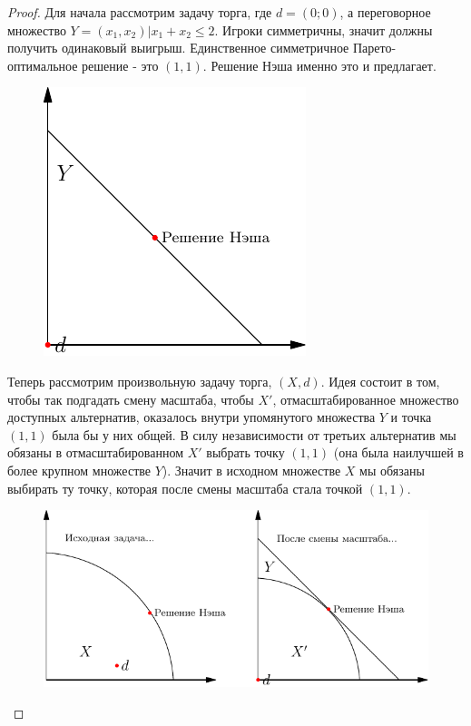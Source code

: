\begin{proof} 

Для начала рассмотрим задачу торга, где $d=(0;0)$, а переговорное
множество $Y={(x_{1},x_{2})|x_{1}+x_{2}\leq2}$. Игроки симметричны,
значит должны получить одинаковый выигрыш. Единственное симметричное
Парето-оптимальное решение - это $(1,1)$. Решение Нэша именно это и предлагает. 

\begin{figure}[htbp]
	\includegraphics{coop_neproof1.pdf}
\end{figure}



Теперь рассмотрим произвольную задачу торга, $(X,d)$. Идея состоит в том, чтобы так подгадать смену масштаба, чтобы $X'$, отмасштабированное множество доступных альтернатив, оказалось внутри упомянутого множества $Y$ и точка $(1,1)$ была бы у них общей. В силу независимости от третьих альтернатив мы обязаны в отмасштабированном $X'$ выбрать точку $(1,1)$ (она была наилучшей в более крупном множестве $Y$). Значит в исходном множестве $X$ мы обязаны выбирать ту точку, которая после смены масштаба стала точкой $(1,1)$.

\begin{figure}[htbp]
	\includegraphics{coop_neproof2.pdf}
\end{figure}



\end{proof}
